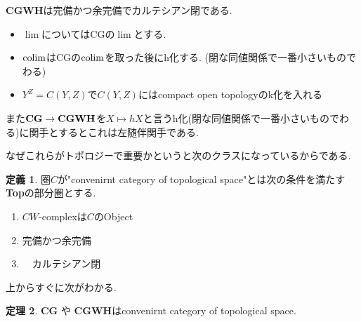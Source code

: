 \documentclass[dvipdfmx,a4paper,11pt]{report}
\newcommand{\colim}{{\rm colim}}
\theoremstyle{definition}
\newtheorem{thm}{定理}
\newtheorem{dfn}[thm]{定義}
\begin{document}
\begin{tcolorbox}
 [colback = white, colframe = green!35!black, fonttitle = \bfseries,breakable = true]
 {\bf CGWH}は完備かつ余完備でカルテシアン閉である.
 \begin{itemize}
 \item $\lim$についてはCGの$\lim$とする. 
 \item $\colim$はCGの$\colim$を取った後にh化する. (閉な同値関係で一番小さいものでわる)
 \item $Y^{Z} = C(Y,Z)$で$C(Y,Z)$にはcompact open topologyのk化を入れる
 \end{itemize}
  また$ {\bf CG}\to { \bf CGWH }$を$X \mapsto hX$と言うh化(閉な同値関係で一番小さいものでわる)に関手とするとこれは左随伴関手である. 
\end{tcolorbox}

なぜこれらがトポロジーで重要かというと次のクラスになっているからである.
\begin{tcolorbox}
 [colback = white, colframe = green!35!black, fonttitle = \bfseries,breakable = true]
 \begin{dfn}
圏$C$が"convenirnt category of topological space"とは次の条件を満たす{\bf Top}の部分圏とする.
\begin{enumerate}
\item $CW$-complexは$C$のObject
\item 完備かつ余完備
\item　カルテシアン閉
\end{enumerate}
  \end{dfn}
\end{tcolorbox}

上からすぐに次がわかる. 

\begin{tcolorbox}
 [colback = white, colframe = green!35!black, fonttitle = \bfseries,breakable = true]
\begin{thm}
{\bf CG} や {\bf CGWH}はconvenirnt category of topological space.
\end{thm}
\end{tcolorbox}
\end{document}
